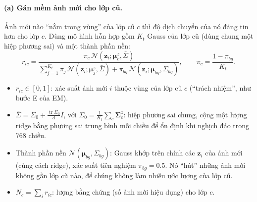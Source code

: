 \documentclass[11pt]{article}
\newcommand{\bmu}{\boldsymbol{\mu}}
\newcommand{\bSigma}{\boldsymbol{\Sigma}}
\newcommand{\vz}{\mathbf{z}}
\newcommand{\muz}{\bmu^{z}}
\newcommand{\Sz}{\bSigma^{z}}
\begin{document}
\paragraph{(a) Gán mềm ảnh mới cho lớp cũ.} Ảnh mới nào ``nằm trong vùng'' của lớp cũ $c$ thì độ dịch chuyển của nó
đáng tin hơn cho lớp $c$. Dùng mô hình hỗn hợp gồm $K_t$ Gauss của lớp cũ (dùng chung một hiệp phương sai) và một
thành phần nền:
\begin{equation}\label{eq:estep}
r_{ic}=\frac{\pi_c\,\mathcal N(\vz_i;\muz_c,\bar\Sigma)}
{\sum_{j=1}^{K_t}\pi_j\,\mathcal N(\vz_i;\muz_j,\bar\Sigma)+\pi_{bg}\,\mathcal N(\vz_i;\bmu_{bg},\Sigma_{bg})},
\qquad \pi_c=\frac{1-\pi_{bg}}{K_t}.
\end{equation}
\begin{itemize}
\item $r_{ic}\in[0,1]$: xác suất ảnh mới $i$ thuộc vùng của lớp cũ $c$ (``trách nhiệm'', như bước E của EM).
\item $\bar\Sigma=\Sigma_0+\frac{\operatorname{tr}\Sigma_0}{d}I$, với $\Sigma_0=\frac1{K_t}\sum_c\Sz_c$: hiệp phương sai
      chung, cộng một lượng ridge bằng phương sai trung bình mỗi chiều để ổn định khi nghịch đảo trong 768 chiều.
\item Thành phần nền $\mathcal N(\bmu_{bg},\Sigma_{bg})$: Gauss khớp trên chính các $\vz_i$ của ảnh mới (cùng cách
      ridge), xác suất tiên nghiệm $\pi_{bg}=0.5$. Nó ``hút'' những ảnh mới không gần lớp cũ nào, để chúng không làm
      nhiễu ước lượng của lớp cũ.
\item $N_c=\sum_i r_{ic}$: lượng bằng chứng (số ảnh mới hiệu dụng) cho lớp $c$.
\end{itemize}
\end{document}
